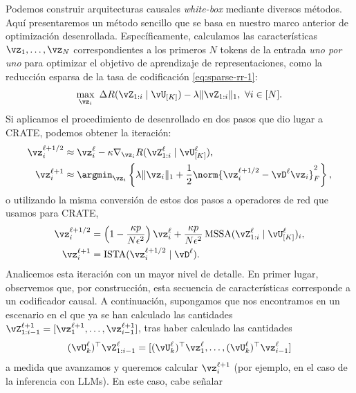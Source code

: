\documentclass[../../book-main.tex]{subfiles}
\begin{document}
Podemos construir arquitecturas causales \textit{white-box} mediante diversos
métodos. Aquí presentaremos un método sencillo que se basa en nuestro
marco anterior de optimización desenrollada. Específicamente, calculamos
las características \(\vz_{1}, \dots, \vz_{N}\) correspondientes a los primeros
\(N\) tokens de la entrada \textit{uno por uno} para optimizar el
objetivo de aprendizaje de representaciones, como la reducción esparsa de la tasa de codificación 
\eqref{eq:sparse-rr-1}:
\begin{equation}
    \max_{\vz_{i}}\ \Delta R(\vZ_{1:i} \mid \vU_{[K]}) - \lambda
    \|\vZ_{1:i}\|_{1},\ \forall i \in [N].
\end{equation}
Si aplicamos el procedimiento de desenrollado en dos pasos que
dio lugar a CRATE, podemos obtener la iteración:
\begin{align}
    \vz_{i}^{\ell + 1/2} &\approx \vz_{i}^{\ell} - \kappa
    \nabla_{\vz_{i}} R(\vZ_{1:i}^{\ell} \mid \vU_{[K]}^{\ell}), \\
    \vz_{i}^{\ell + 1} &\approx \argmin_{\vz_{i}} \left\{\lambda
        \|\vz_{i}\|_{1} + \frac{1}{2}\norm{\vz_{i}^{\ell + 1/2} -
    \vD^{\ell} {\vz_{i}}}_F^2\right\},
\end{align}
o utilizando la misma conversión de estos dos pasos a operadores de red
que usamos para CRATE,
\begin{align}
    \vz_{i}^{\ell + 1/2}
    &= \left(1 - \frac{\kappa p}{N\epsilon^{2}}\right)\vz_{i}^{\ell}
    + \frac{\kappa p}{N
    \epsilon^{2}}\operatorname{MSSA}(\vZ_{1:i}^{\ell} \mid
    \vU_{[K]}^{\ell})_{i}, \\
    \vz_{i}^{\ell + 1}
    &= \operatorname{ISTA}(\vz_{i}^{\ell + 1/2} \mid \vD^{\ell}).
\end{align}
Analicemos esta iteración con un mayor nivel de detalle. En primer lugar, observemos 
que, por construcción, esta secuencia de características corresponde a un codificador 
causal. A continuación, supongamos que nos encontramos en un escenario en el que ya se 
han calculado las cantidades \(\vZ_{1:i-1}^{\ell+1} = [\vz_1^{\ell+1}, \dots, \vz_{i-1}^{\ell+1}]\), 
tras haber calculado las cantidades
\begin{equation}
    (\vU_{k}^{\ell})^{\top}\vZ_{1:i-1}^{\ell} =
    [(\vU_{k}^{\ell})^{\top}\vz_{1}^{\ell}, \dots,
    (\vU_{k}^{\ell})^{\top}\vz_{i-1}^{\ell}]
\end{equation}
a medida que avanzamos y queremos calcular \(\vz_{i}^{\ell + 1}\) (por
ejemplo, en el caso de la inferencia con LLMs). En este caso, cabe señalar
\end{document}
